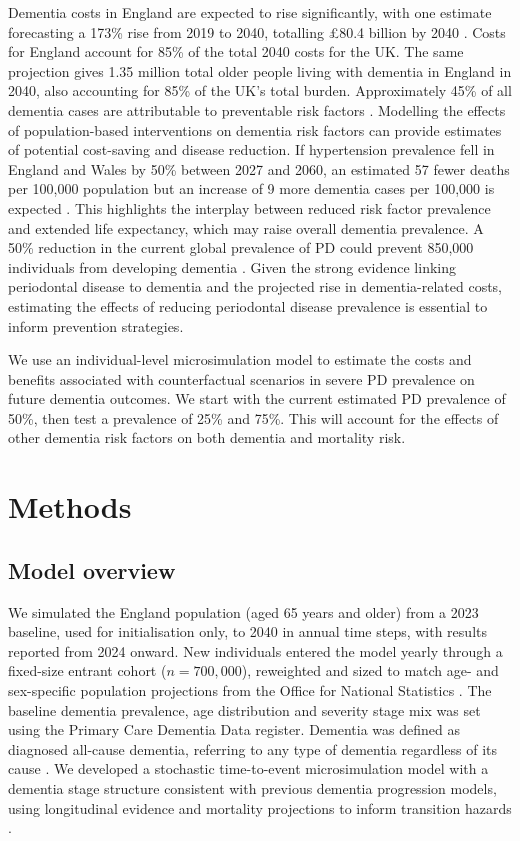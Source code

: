 \documentclass[11pt,a4paper]{article}
\begin{document}
Dementia costs in England are expected to rise significantly, with one estimate forecasting a 173\% rise from 2019 to 2040, totalling \pounds80.4 billion by 2040 \cite{ref17}. Costs for England account for 85\% of the total 2040 costs for the UK. The same projection gives 1.35 million total older people living with dementia in England in 2040, also accounting for 85\% of the UK's total burden. Approximately 45\% of all dementia cases are attributable to preventable risk factors \cite{ref18}. Modelling the effects of population-based interventions on dementia risk factors can provide estimates of potential cost-saving and disease reduction. If hypertension prevalence fell in England and Wales by 50\% between 2027 and 2060, an estimated 57 fewer deaths per 100,000 population but an increase of 9 more dementia cases per 100,000 is expected \cite{ref19}. This highlights the interplay between reduced risk factor prevalence and extended life expectancy, which may raise overall dementia prevalence. A 50\% reduction in the current global prevalence of PD could prevent 850,000 individuals from developing dementia \cite{ref6}. Given the strong evidence linking periodontal disease to dementia and the projected rise in dementia-related costs, estimating the effects of reducing periodontal disease prevalence is essential to inform prevention strategies.

We use an individual-level microsimulation model to estimate the costs and benefits associated with counterfactual scenarios in severe PD prevalence on future dementia outcomes. We start with the current estimated PD prevalence of 50\%, then test a prevalence of 25\% and 75\%. This will account for the effects of other dementia risk factors on both dementia and mortality risk.

\section{Methods}

\subsection{Model overview}

We simulated the England population (aged 65 years and older) from a 2023 baseline, used for initialisation only, to 2040 in annual time steps, with results reported from 2024 onward. New individuals entered the model yearly through a fixed-size entrant cohort ($n = 700{,}000$), reweighted and sized to match age- and sex-specific population projections from the Office for National Statistics \cite{ref20,ref21}. The baseline dementia prevalence, age distribution and severity stage mix was set using the Primary Care Dementia Data register. Dementia was defined as diagnosed all-cause dementia, referring to any type of dementia regardless of its cause \cite{ref22}. We developed a stochastic time-to-event microsimulation model with a dementia stage structure consistent with previous dementia progression models, using longitudinal evidence and mortality projections to inform transition hazards \cite{ref19,ref23,ref24,ref25}.
\end{document}
